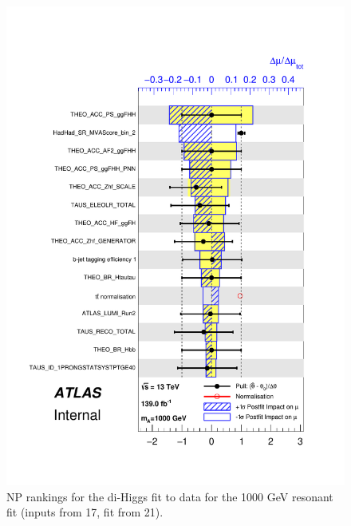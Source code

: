 \begin{figure}
\centering
\includegraphics[width=.8\textwidth]{figures/results/HH/HadHad/HadHadFit21062021/PullsAndRankings/pulls_SigXsecOverSM_1000.pdf}
\caption{NP rankings for the di-Higgs \hadhad fit to data for the 1000 GeV resonant fit (inputs from 17, fit from 21).}
\label{fig:HadHadPostfitNPRankings2HDM1000}
\end{figure}

